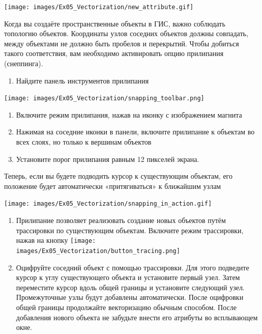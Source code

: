 \documentclass[
  12pt,
]{book}
\providecommand{\tightlist}{%
  \setlength{\itemsep}{0pt}\setlength{\parskip}{0pt}}
\begin{document}
\texttt{[image: images/Ex05\_Vectorization/new\_attribute.gif]}

Когда вы создаёте пространственные объекты в ГИС, важно соблюдать топологию объектов. Координаты узлов соседних объектов должны совпадать, между объектами не должно быть пробелов и перекрытий. Чтобы добиться такого соответствия, вам необходимо активировать опцию прилипания (снеппинга).

\begin{enumerate}
\def\labelenumi{\arabic{enumi}.}
\setcounter{enumi}{6}
\tightlist
\item
  Найдите панель инструментов прилипания
\end{enumerate}

\texttt{[image: images/Ex05\_Vectorization/snapping\_toolbar.png]}

\begin{enumerate}
\def\labelenumi{\arabic{enumi}.}
\setcounter{enumi}{7}
\item
  Включите режим прилипания, нажав на иконку с изображением магнита
\item
  Нажимая на соседние иконки в панели, включите прилипание к объектам во всех слоях, но только к вершинам объектов
\item
  Установите порог прилипания равным 12 пикселей экрана.
\end{enumerate}

Теперь, если вы будете подводить курсор к существующим объектам, его положение будет автоматически «притягиваться» к ближайшим узлам

\texttt{[image: images/Ex05\_Vectorization/snapping\_in\_action.gif]}

\begin{enumerate}
\def\labelenumi{\arabic{enumi}.}
\setcounter{enumi}{10}
\item
  Прилипание позволяет реализовать создание новых объектов путём трассировки по существующим объектам. Включите режим трассировки, нажав на кнопку \texttt{[image: images/Ex05\_Vectorization/button\_tracing.png]}
\item
  Оцифруйте соседний объект с помощью трассировки. Для этого подведите курсор к углу существующего объекта и установите первый узел. Затем переместите курсор вдоль общей границы и установите следующий узел. Промежуточные узлы будут добавлены автоматически. После оцифровки общей границы продолжайте векторизацию обычным способом. После добавления нового объекта не забудьте внести его атрибуты во всплывающем окне.
\end{enumerate}
\end{document}
